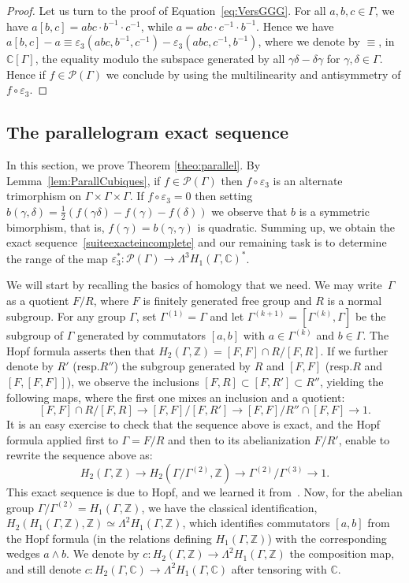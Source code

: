 \documentclass[11pt]{article}
\newcommand{\resp}{resp.\xspace}
\let\mathcal\mathscr
\theoremstyle{definition}
\newcommand{\ZZ}{\mathbb{Z}}
\newcommand{\CC}{\mathbb{C}}
\begin{document}
\begin{proof}
Let us turn to the proof of Equation~\eqref{eq:VersGGG}.
For all $a,b,c\in\Gamma$, we have
$a[b,c]=abc\cdot b^{-1}\cdot c^{-1}$, while $a=abc\cdot c^{-1}\cdot b^{-1}$.
Hence we have
$a[b,c]-a\equiv\varepsilon_3(abc,b^{-1},c^{-1})-
\varepsilon_3(abc,c^{-1},b^{-1})$,
where we denote by $\equiv$, in $\CC[\Gamma]$, the equality modulo the
subspace generated by all $\gamma\delta-\delta\gamma$ for
$\gamma,\delta\in\Gamma$.
Hence if $f\in \mathcal{P}(\Gamma)$ we conclude by using the multilinearity
and antisymmetry of $f\circ \varepsilon_3$.
\end{proof}

\subsection{The parallelogram exact sequence}\label{ssec:suiteexacte}
In this section, we prove Theorem \ref{theo:parallel}.
By Lemma~\ref{lem:ParallCubiques},
if $f\in \mathcal{P}(\Gamma)$ then
$f\circ\varepsilon_3$ is an alternate trimorphism on
$\Gamma\times \Gamma\times \Gamma$. If $f\circ \varepsilon_3=0$ then setting
$b(\gamma,\delta)=\frac{1}{2}(f(\gamma\delta)-f(\gamma)-f(\delta))$
we observe that $b$ is a symmetric bimorphism, that is,
$f(\gamma)=b(\gamma,\gamma)$ is quadratic.
Summing up, we obtain the exact sequence~\eqref{suiteexacteincomplete} and
our remaining task is to determine the range of the map
$\varepsilon_3^*\colon
\mathcal{P}(\Gamma)\to\Lambda^3H_1(\Gamma,\CC)^*$.

We will start by recalling the basics of homology that we need.
We may write~$\Gamma$ as a quotient $F/R$, where $F$ is finitely generated
free group and $R$ is a normal subgroup.
For any group $\Gamma$, set $\Gamma^{(1)}=\Gamma$
and let $\Gamma^{(k+1)}=[\Gamma^{(k)},\Gamma]$ be the subgroup of
$\Gamma$ generated by commutators
$[a,b]$ with $a\in \Gamma^{(k)}$ and $b\in \Gamma$.
The Hopf formula asserts then that
$H_2(\Gamma,\ZZ)=[F,F]\cap R/[F,R]$. If we further denote by
$R'$ (\resp $R''$) the subgroup generated by $R$ and $[F,F]$
(\resp $R$ and $[F,[F,F]]$),
we observe the inclusions \hbox{$[F,R]\subset[F,R']\subset R''$}, yielding the
following maps, where the first one mixes an inclusion and a quotient:
\[ [F,F]\cap R/[F,R]\to [F,F]/[F,R'] \to [F,F]/R''\cap[F,F]\to 1. \]
It is an easy exercise to check that the sequence above is exact, and
the Hopf formula applied first to $\Gamma=F/R$ and then to its
abelianization $F/R'$, enable to rewrite the sequence above as:
\begin{equation}\label{eq:Stallings}
H_2(\Gamma,\ZZ)\to H_2(\Gamma/\Gamma^{(2)},\ZZ)\to \Gamma^{(2)}/\Gamma^{(3)}
\to 1.
\end{equation}
This exact sequence is due to Hopf, and we learned it from~\cite{Stallings}.
Now, for the abelian group $\Gamma/\Gamma^{(2)}=H_1(\Gamma,\ZZ)$, we
have the classical identification,
$H_2(H_1(\Gamma,\ZZ),\ZZ)\simeq\Lambda^2 H_1(\Gamma,\ZZ)$, which
identifies commutators $[a,b]$ from the Hopf formula (in the relations
defining $H_1(\Gamma,\ZZ)$) with the corresponding wedges $a\wedge b$.
We denote by $c\colon H_2(\Gamma,\ZZ)\to\Lambda^2H_1(\Gamma,\ZZ)$ the
composition map, and still denote
$c\colon H_2(\Gamma,\CC)\to\Lambda^2H_1(\Gamma,\CC)$ after tensoring with $\CC$.
\end{document}

